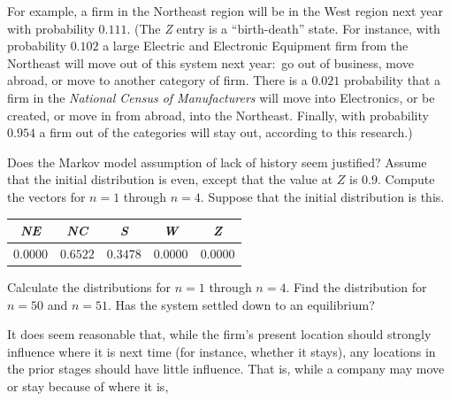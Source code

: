 \begin{exercises}
{\begin{center}
\begin{tabular}{c|ccccc}
      \end{tabular}
    \end{center}}
    For example, a firm in the Northeast region will be in the West region
    next year with probability $0.111$.
    (The \textit{Z} entry is a ``birth-death'' state.
     For instance, 
     with probability $0.102$ a large Electric and Electronic Equipment
     firm from the Northeast will move out of this system next year:~go
     out of business, move abroad, or move to another category of firm.
     There is a $0.021$ probability that a firm 
     in the \emph{National Census of Manufacturers}
     will move into Electronics, or be created, or move in from abroad, 
     into the Northeast.
     Finally, with probability $0.954$ a firm out of the categories
     will stay out, according to this research.)
    \begin{exparts}
      \partsitem Does the Markov model assumption of lack of history seem
        justified?
      \partsitem Assume that the initial distribution is even, except that
        the value at $Z$ is $0.9$.
        Compute the vectors for $n=1$ through $n=4$.
      \partsitem Suppose that the initial distribution is this.
        \begin{center}
          \begin{tabular}{ccccc}
              \textit{NE}      
              &\textit{NC}      
              &\textit{S}       
              &\textit{W}       
              &\textit{Z}       \\ \hline
              $0.0000$ &$0.6522$ &$0.3478$ &$0.0000$ &$0.0000$
          \end{tabular}
        \end{center}
        Calculate the distributions for $n=1$ through $n=4$.
      \partsitem Find the distribution for $n=50$ and $n=51$.
        Has the system settled down to an equilibrium?
    \end{exparts}
    \begin{answer}
     \begin{exparts}
      \partsitem It does seem reasonable that, while the firm's present 
        location should strongly influence where it is next time (for 
        instance, whether it stays), any locations in the prior stages should
        have little influence.
        That is, while a company may move or stay because of where it is, 

\end{exparts}
\end{answer}
\end{exercises}
